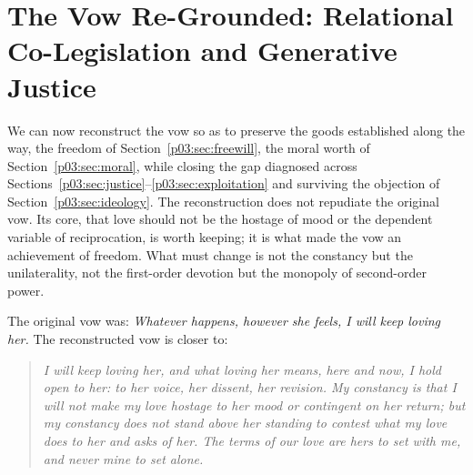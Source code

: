 \section{The Vow Re-Grounded: Relational Co-Legislation and Generative Justice}\label{p03:sec:regrounded}

We can now reconstruct the vow so as to preserve the goods established along the way, the freedom of Section~\ref{p03:sec:freewill}, the moral worth of Section~\ref{p03:sec:moral}, while closing the gap diagnosed across Sections~\ref{p03:sec:justice}--\ref{p03:sec:exploitation} and surviving the objection of Section~\ref{p03:sec:ideology}. The reconstruction does not repudiate the original vow. Its core, that love should not be the hostage of mood or the dependent variable of reciprocation, is worth keeping; it is what made the vow an achievement of freedom. What must change is not the constancy but the unilaterality, not the first-order devotion but the monopoly of second-order power.

The original vow was: \emph{Whatever happens, however she feels, I will keep loving her.} The reconstructed vow is closer to:

\begin{quote}\itshape
I will keep loving her, and what loving her means, here and now, I hold open to her: to her voice, her dissent, her revision. My constancy is that I will not make my love hostage to her mood or contingent on her return; but my constancy does not stand above her standing to contest what my love does to her and asks of her. The terms of our love are hers to set with me, and never mine to set alone.
\end{quote}

